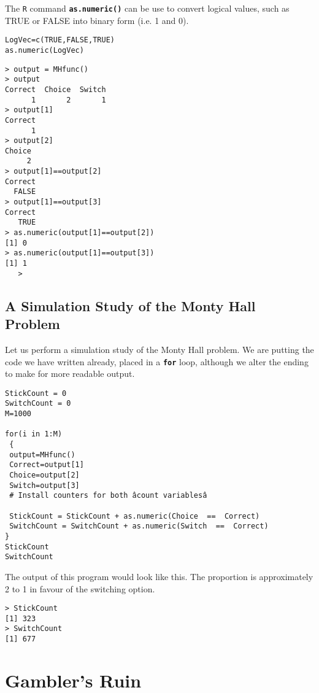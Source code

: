 \documentclass[a4paper,12pt]{article}
\begin{document}
The \texttt{R} command \texttt{\textbf{as.numeric()}} can be use to convert logical values, such as TRUE or FALSE into binary form (i.e. 1 and 0).

\begin{framed}
\begin{verbatim}
LogVec=c(TRUE,FALSE,TRUE)
as.numeric(LogVec)
\end{verbatim}
\end{framed}
\begin{verbatim}
> output = MHfunc()
> output
Correct  Choice  Switch
      1       2       1
> output[1]
Correct
      1
> output[2]
Choice
     2
> output[1]==output[2]
Correct
  FALSE
> output[1]==output[3]
Correct
   TRUE
> as.numeric(output[1]==output[2])
[1] 0
> as.numeric(output[1]==output[3])
[1] 1
   >
\end{verbatim}

\subsection{A Simulation Study of the Monty Hall Problem}

Let us perform a simulation study of the Monty Hall problem. We are putting the code we have written already, placed in a \texttt{\textbf{for}} loop, although we alter the ending to make for more readable output.

\begin{framed}
\begin{verbatim}
StickCount = 0
SwitchCount = 0
M=1000

for(i in 1:M)
 {
 output=MHfunc()
 Correct=output[1]
 Choice=output[2]
 Switch=output[3]
 # Install counters for both âcount variablesâ

 StickCount = StickCount + as.numeric(Choice  ==  Correct)
 SwitchCount = SwitchCount + as.numeric(Switch  ==  Correct)
}
StickCount
SwitchCount
\end{verbatim}
\end{framed}

The output of this program would look like this. The proportion is approximately 2 to 1 in favour of the switching option.
\begin{verbatim}
> StickCount
[1] 323
> SwitchCount
[1] 677
\end{verbatim}
\newpage
\section{Gambler's Ruin}
\end{document}

